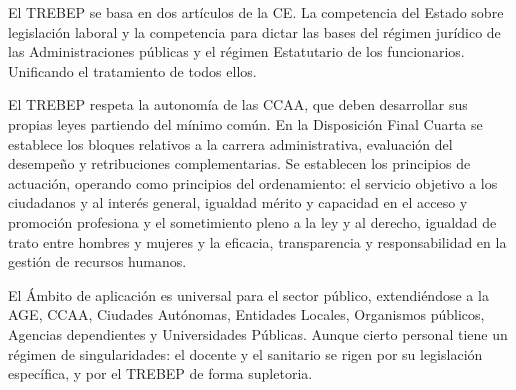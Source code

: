         El TREBEP se basa en dos artículos de la CE. La competencia del Estado sobre legislación laboral y la competencia para dictar las bases del régimen jurídico de las Administraciones públicas y el régimen Estatutario de los funcionarios. Unificando el tratamiento de todos ellos.

        El TREBEP respeta la autonomía de las CCAA, que deben desarrollar sus propias leyes partiendo del mínimo común. En la Disposición Final Cuarta se establece los bloques relativos a la carrera administrativa, evaluación del desempeño y retribuciones complementarias. Se establecen los principios de actuación, operando como principios del ordenamiento: el servicio objetivo a los ciudadanos y al interés general, igualdad mérito y capacidad en el acceso y promoción profesiona y el sometimiento pleno a la ley y al derecho, igualdad de trato entre hombres y mujeres y la eficacia, transparencia y responsabilidad en la gestión de recursos humanos.

        El Ámbito de aplicación es universal para el sector público, extendiéndose a la AGE, CCAA, Ciudades Autónomas, Entidades Locales, Organismos públicos, Agencias dependientes y Universidades Públicas. Aunque cierto personal tiene un régimen de singularidades: el docente y el sanitario se rigen por su legislación específica, y por el TREBEP de forma supletoria.


